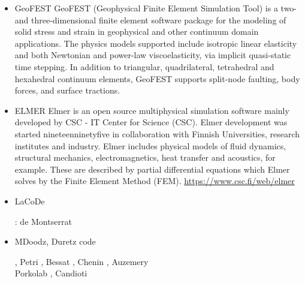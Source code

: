\begin{itemize}
\item {\codefont GeoFEST} 
GeoFEST (Geophysical Finite Element Simulation Tool) is a two- and three-dimensional finite
element software package for the modeling of solid stress and strain in geophysical and 
other continuum domain applications.
The physics models supported include isotropic linear elasticity and both Newtonian and power-law
viscoelasticity, via implicit quasi-static time stepping. In addition to triangular, 
quadrilateral, tetrahedral and hexahedral continuum elements, GeoFEST supports split-node 
faulting, body forces, and surface tractions.


{\small
\noindent
\cite{paln08}
}

\item {\codefont ELMER} 
Elmer is an open source multiphysical simulation software mainly developed by 
CSC - IT Center for Science (CSC). Elmer development was started nineteenninetyfive in collaboration with 
Finnish Universities, research institutes and industry. Elmer includes physical models of 
fluid dynamics, structural mechanics, electromagnetics, heat transfer and acoustics, 
for example. These are described by partial differential equations which Elmer solves 
by the Finite Element Method (FEM). \url{https://www.csc.fi/web/elmer}

\cite{maierova}
\cite{mals14}

\item {\codefont LaCoDe}  

\begin{scriptsize}
\noindent
\twothousandnineteen: de Montserrat \etal \cite{demh19}
\end{scriptsize}

\item {\codefont MDoodz}, Duretz code

\begin{scriptsize}
\cite{yatd12}
\cite{yahb13}
\cite{yadm15}
\cite{dumy16}\cite{dupm16}
\cite{chmd19}\cite{dual19}, Petri \etal \cite{pedm19}
\cite{poyd20}, Bessat \etal \cite{bedh20}, Chenin \etal \cite{chsm20}, Auzemery \etal \cite{auwy20}\\
\twothousandtwentyone Porkolab \etal \cite{pody21}, Candioti \etal \cite{cadm21}
\end{scriptsize}


\end{itemize}
